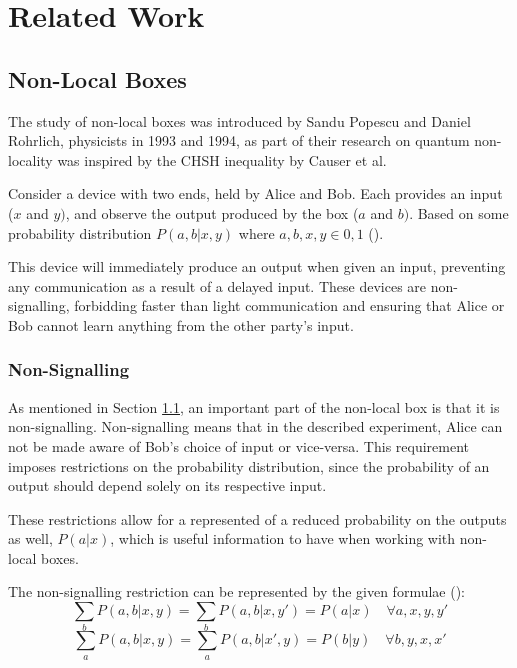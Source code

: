 \documentclass[report.tex]{subfiles}
\begin{document}
\chapter{Related Work} %
\label{cha:related_work}


\section{Non-Local Boxes} %
\label{sec:non_local_boxes}
The study of non-local boxes was introduced by Sandu Popescu and Daniel
Rohrlich, physicists in 1993 and 1994, as part of their research on quantum
non-locality was inspired by the CHSH inequality by Causer et al.

Consider a device with two ends, held by Alice and Bob. Each provides an
input (\(x\) and \(y)\), and observe the output produced by the box (\(a\) and
\(b)\). Based on some probability distribution \(P(a,b | x,y)\) where \(a, b, x,
y \in {0, 1}\) (\cite[Definition~1]{nlb_lamontagne}). 

This device will immediately produce an output when given an input, preventing
any communication as a result of a delayed input. These devices are
non-signalling, forbidding faster than light communication and ensuring that
Alice or Bob cannot learn anything from the other party's input.

\subsection{Non-Signalling} %
\label{sub:non_signalling}
As mentioned in Section \ref{sec:non_local_boxes}, an important part of the
non-local box is that it is non-signalling. Non-signalling means that in the
described experiment, Alice can not be made aware of Bob's choice of input or
vice-versa. This requirement imposes restrictions on the probability
distribution, since the probability of an output should depend solely on its
respective input. 

These restrictions allow for a represented of a reduced probability on the
outputs as well, \(P(a | x)\), which is useful information to have when
working with non-local boxes.

The non-signalling restriction can be represented by the given formulae
(\cite[Section~II.A]{PhysRevA.71.022101}):
\[\sum_{b} P(a, b | x, y) = \sum_{b} P(a, b | x, y') = P(a | x) 
\quad \forall a, x, y, y'\]
\[\sum_{a} P(a, b | x, y) = \sum_{a} P(a, b | x', y) = P(b | y) 
\quad \forall b, y, x, x'\]
\end{document}

